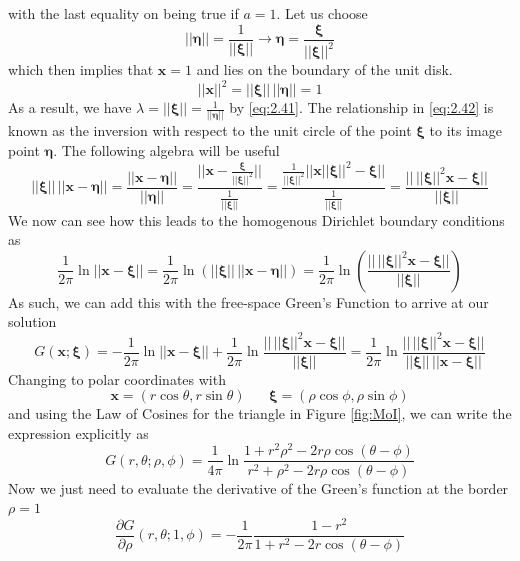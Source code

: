 \documentclass{article}
\newcommand{\pd}[2]{\frac{\partial #1}{\partial #2}}
\newcommand{\vb}[1]{\mathbf{ #1}}
\newcommand{\ggf}{G(\vb{x}; \boldsymbol{\xi})}
\newcommand{\norm}[1]{|| #1 ||}
\newcommand{\bs}[1]{\boldsymbol{#1}}
\numberwithin{equation}{section}
\begin{document}
with the last equality on being true if $a=1$. Let us choose 
\begin{equation}
    \norm{\boldsymbol{\eta}} = \frac{1}{\norm{\boldsymbol{\xi}}} \rightarrow \boldsymbol{\eta} = \frac{\boldsymbol{\xi}}{\norm{\boldsymbol{\xi}}^2} \label{eq:2.42}
\end{equation}
which then implies that $\vb{x}=1$ and lies on the boundary of the unit disk.
\begin{equation*}
    \norm{\vb{x}}^2 = \norm{\bs{\xi}}\,\norm{\bs{\eta}} = 1
\end{equation*}
As a result, we have $\lambda= \norm{\bs{\xi}}=\frac{1}{\norm{\bs{\eta}}}$ by \eqref{eq:2.41}. The relationship in \eqref{eq:2.42} is known as the inversion with respect to the unit circle of the point $\bs{\xi}$ to its image point $\bs{\eta}$. The following algebra will be useful
\begin{equation*}
    \norm{\bs{\xi}}
\,\norm{\vb{x}-\bs{\eta}} = \frac{\norm{\vb{x}-\bs{\eta}}}{\norm{\bs{\eta}}} = \frac{\norm{\vb{x}-\frac{\bs{\xi}}{\norm{\bs{\xi}}^2}}}{\frac{1}{\norm{\bs{\xi}}}}=\frac{\frac{1}{\norm{\bs{\xi}}^2}\norm{\vb{x}\norm{\bs{\xi}}^2-\bs{\xi}}}{\frac{1}{\norm{\bs{\xi}}}} = \frac{\norm{\,\norm{\bs{\xi}}^2\vb{x}-\bs{\xi}}}{\norm{\bs{\xi}}}
\end{equation*}
We now can see how this leads to the homogenous Dirichlet boundary conditions as
\begin{equation}
    \frac{1}{2\pi}\ln \norm{\vb{x} - \bs{\xi}} =\frac{1}{2\pi}\ln \left(  \norm{\bs{\xi}}
\,\norm{\vb{x}-\bs{\eta}}\right) = \frac{1}{2\pi}\ln \left( \frac{\norm{\,\norm{\bs{\xi}}^2\vb{x}-\bs{\xi}}}{\norm{\bs{\xi}}} \right)
\end{equation}
As such, we can add this with the free-space Green's Function to arrive at our solution
\begin{equation}
    \ggf = -\frac{1}{2\pi} \ln \norm{\vb{x} - \bs{\xi}} + \frac{1}{2\pi}\ln \frac{\norm{\,\norm{\bs{\xi}}^2\vb{x}-\bs{\xi}}}{\norm{\bs{\xi}}} = \frac{1}{2\pi} \ln \frac{\norm{\,\norm{\bs{\xi}}^2\vb{x}-\bs{\xi}}}{\norm{\bs{\xi}}\, \norm{\vb{x}-\bs{\xi}}}
\end{equation}
Changing to polar coordinates with 
\begin{equation*}
    \vb{x} = (r \cos \theta, r\sin\theta) \hspace{20pt} \bs{\xi} = (\rho \cos \phi, \rho \sin \phi)
\end{equation*}
and using the Law of Cosines for the triangle in Figure \ref{fig:MoI}, we can write the expression explicitly as 
\begin{equation}
    G(r,\theta; \rho,\phi)=\frac{1}{4\pi} \ln \frac{1+r^2\rho ^2-2r\rho \cos(\theta-\phi)}{r^2+\rho^2-2r\rho \cos(\theta - \phi)} \label{eq:2.45}
\end{equation}
Now we just need to evaluate the derivative of the Green's function at the border $\rho = 1$
\begin{equation}
    \pd{G}{\rho}(r,\theta;1,\phi) =-\frac{1}{2\pi}\frac{1-r^2}{1+r^2-2r\cos (\theta - \phi)} \label{eq:2.46}
\end{equation}
\end{document}
